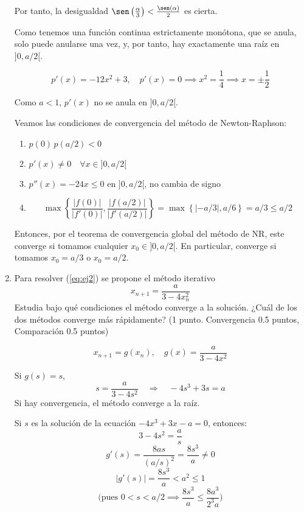 \documentclass[12pt]{article}
\begin{document}
\begin{ejercicio}[4 puntos]
\begin{enumerate}
          Por tanto, la desigualdad $\sen\left(\frac{\alpha}{3}\right) < \frac{\sen(\alpha)}{2}$ es cierta.

          Como tenemos una función continua estrictamente monótona, que se anula, solo puede anularse una vez, y, por tanto, hay exactamente una raíz en \(]0, a/2[\).

          \[
          p'(x) = -12x^2 + 3, \quad p'(x)=0 \implies x^2 = \frac14 \implies x = \pm \frac12
          \]

          Como \(a < 1\), \(p'(x)\) no se anula en \(]0, a/2[\).

          Veamos las condiciones de convergencia del método de Newton-Raphson:
          \begin{enumerate}
            \item \(p(0) \, p(a/2) < 0\)
            \item \(p'(x) \neq 0 \quad \forall x \in ]0,a/2[\)
            \item \(p''(x) = -24x \le 0\) en \(]0, a/2[\), no cambia de signo
            \item \[
                  \max \left\{ \frac{|f(0)|}{|f'(0)|}, \frac{|f(a/2)|}{|f'(a/2)|} \right\}
                  = \max \left\{ |-a/3|, a/6 \right\} = a/3 \le a/2
                  \]
          \end{enumerate}

          Entonces, por el teorema de convergencia global del método de NR, este converge si tomamos cualquier \(x_0 \in ]0, a/2[\). En particular, converge si tomamos \(x_0 = a/3\) o \(x_0 = a/2\).


          \item Para resolver (\ref{eq:ej2}) se propone el método iterativo
          \[
          x_{n+1} = \frac{a}{3 - 4x_n^2}
          \]
          Estudia bajo qué condiciones el método converge a la solución. ¿Cuál de los dos métodos converge más rápidamente? (1 punto. Convergencia 0.5 puntos, Comparación 0.5 puntos)

          \[
          x_{n+1} = g(x_n), \quad g(x) = \frac{a}{3 - 4x^2}
          \]

          Si \(g(s) = s\),  
          \[
          s = \frac{a}{3 - 4s^2} \quad\Rightarrow\quad -4s^3 + 3s = a
          \]
          Si hay convergencia, el método converge a la raíz.

          Si \(s\) es la solución de la ecuación \(-4x^3 + 3x - a = 0\), entonces:
          \[
          3 - 4s^2 = \frac{a}{s}
          \]
          \[
          g'(s) = \frac{8as}{(a/s)^2} = \frac{8s^3}{a} \neq 0
          \]
          \[
          |g'(s)| = \frac{8s^3}{a} < a^2 \le 1
          \]
          \[
          \text{(pues \(0 < s < a/2 \implies \frac{8s^3}{a} \le \frac{8 a^3}{2^3 a}\))}
          \]


\end{enumerate}
\end{ejercicio}
\end{document}
